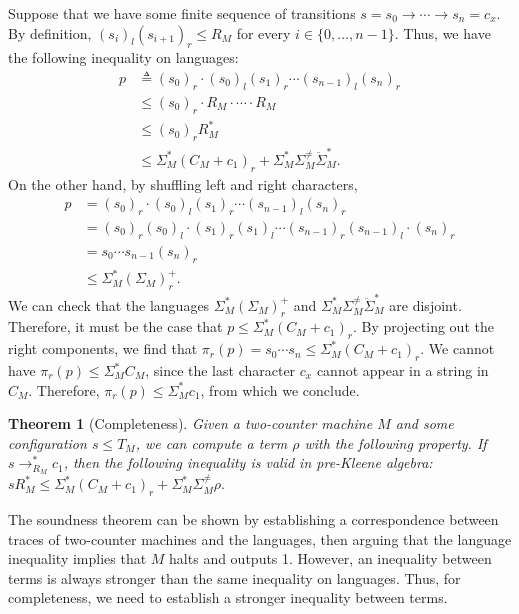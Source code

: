 \documentclass[11pt,a4paper]{amsart}
\newtheorem{theorem}{Theorem}
\theoremstyle{definition}
\begin{document}
\begin{proofEnd}
  Suppose that we have some finite sequence of transitions
  $s = s_0  \to   \cdots   \to  s_n = c_x$.  By definition, $(s_i)_l(s_{i+1})_r  \leq  R_M$ for
  every $i  \in  \{0, \ldots ,n-1\}$.  Thus, we have the following inequality on languages:
  \begin{align*}
    p
    &  \triangleq  (s_0)_r  \cdot  (s_0)_l(s_1)_r  \cdots  (s_{n-1})_l(s_n)_r \\
    &  \leq  (s_0)_r  \cdot  R_M  \cdot   \cdots   \cdot  R_M \\
    &  \leq  (s_0)_rR_M^* \\
    &  \leq   \Sigma _M^*(C_M + c_1)_r +  \Sigma _M^* \Sigma _M^{ \neq }\ddot{ \Sigma }_M^*.
  \end{align*}
  On the other hand, by shuffling left and right characters,
  \begin{align*}
    p
    & = (s_0)_r  \cdot  (s_0)_l(s_1)_r  \cdots  (s_{n-1})_l(s_n)_r \\
    & = (s_0)_r(s_0)_l  \cdot  (s_1)_r(s_1)_l  \cdots  (s_{n-1})_r(s_{n-1})_l  \cdot  (s_n)_r \\
    & = s_0  \cdots  s_{n-1} (s_{n})_r \\
    &  \leq   \Sigma _M^*( \Sigma _M)_r^+.
  \end{align*}
  We can check that the languages $ \Sigma _M^*( \Sigma _M)_r^+$ and
  $ \Sigma _M^* \Sigma _M^{ \neq }\ddot{ \Sigma }_M^*$ are disjoint.  Therefore, it must be the case that
  $p  \leq   \Sigma _M^*(C_M + c_1)_r$.  By projecting out the right components, we find that
  $ \pi _r(p) = s_0  \cdots  s_n  \leq   \Sigma _M^*(C_M + c_1)_r$.  We cannot have
  $ \pi _r(p)  \leq   \Sigma _M^*C_M$, since the last character $c_x$ cannot appear in a string
  in $C_M$.  Therefore, $ \pi _r(p)  \leq   \Sigma _M^*c_1$, from which we conclude.
\end{proofEnd}


\begin{theorem}[Completeness]
  \label{thm:completeness}
  Given a two-counter machine $M$ and some configuration $s  \leq  T_M$, we can
  compute a term $ \rho $ with the following property.  If $s  \to _{R_M}^* c_1$, then
  the following inequality is valid in \emph{pre}-Kleene algebra:
  \( sR_M^*  \leq   \Sigma _M^*(C_M + c_1)_r +  \Sigma _M^* \Sigma _M^{ \neq } \rho . \)
\end{theorem}

The soundness theorem can be shown by establishing a correspondence between
traces of two-counter machines and the languages, then arguing that the language
inequality implies that \(M\) halts and outputs 1.  However, an inequality
between terms is always stronger than the same inequality on languages.  Thus,
for completeness, we need to establish a stronger inequality between terms.
\end{document}
